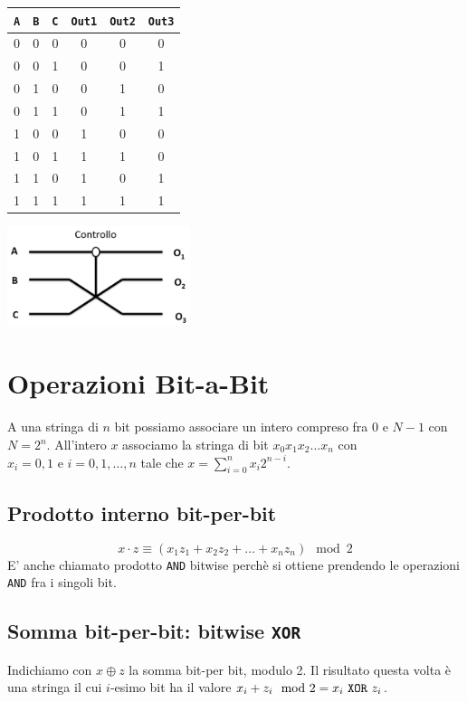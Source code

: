 \documentclass[12pt, a4paper]{report}
\begin{document}
\begin{center}
    \begin{tabular}{|c|c|c|c|c|c|}
    \hline
    \texttt{A} & \texttt{B} & \texttt{C} & \texttt{Out1} & \texttt{Out2} & \texttt{Out3} \\
    \hline
    0 & 0 & 0 & 0 & 0 & 0 \\
    \hline
    0 & 0 & 1 & 0 & 0 & 1 \\
    \hline
    0 & 1 & 0 & 0 & 1 & 0 \\
    \hline
    0 & 1 & 1 & 0 & 1 & 1 \\
    \hline
    1 & 0 & 0 & 1 & 0 & 0 \\
    \hline
    1 & 0 & 1 & 1 & 1 & 0 \\
    \hline
    1 & 1 & 0 & 1 & 0 & 1 \\
    \hline
    1 & 1 & 1 & 1 & 1 & 1 \\
    \hline
    \end{tabular}
    \includegraphics[width=0.4\textwidth]{Immagini/fredkin_circuit.png}
\end{center}
\section{Operazioni Bit-a-Bit}
A una stringa di $n$ bit possiamo associare un intero compreso fra 0 e $N-1$ con $N=2^n$. All'intero $x$ associamo la stringa di bit $x_0x_1x_2\dots x_{n}$ con $x_{i}=0,1 \text{ e } i=0,1,\dots,n$ tale che $x=\sum_{i=0}^{n}x_{i}2^{n-i}$.
\subsection{Prodotto interno bit-per-bit}
\begin{equation*}
    x\cdot z \equiv (x_{1}z_{1} + x_{2}z_{2} + \dots + x_{n}z_{n}) \mod 2
\end{equation*}
E' anche chiamato prodotto \texttt{AND} bitwise perchè si ottiene prendendo le operazioni \texttt{AND} fra i singoli bit.
\subsection{Somma bit-per-bit: bitwise \texttt{XOR}}
Indichiamo con $x\oplus z$ la somma bit-per bit, modulo 2. Il risultato questa volta è una stringa il cui $i$-esimo bit ha il valore $x_{i}+z_{i} \mod 2 = x_{i} \text{ \texttt{XOR} } z_{i}$.
\end{document}
